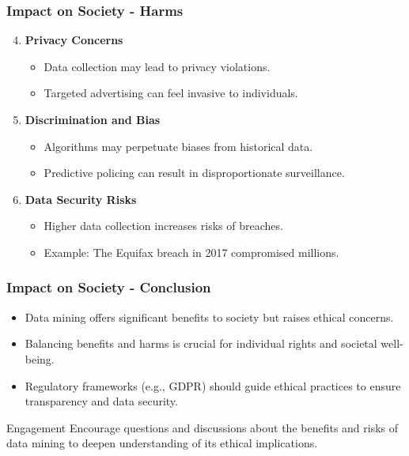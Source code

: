\documentclass{beamer}
\begin{document}
\begin{frame}[fragile]
    \frametitle{Impact on Society - Harms}
    \begin{enumerate}
        \setcounter{enumi}{3} %
        \item \textbf{Privacy Concerns}
            \begin{itemize}
                \item Data collection may lead to privacy violations.
                \item Targeted advertising can feel invasive to individuals.
            \end{itemize}

        \item \textbf{Discrimination and Bias}
            \begin{itemize}
                \item Algorithms may perpetuate biases from historical data.
                \item Predictive policing can result in disproportionate surveillance.
            \end{itemize}

        \item \textbf{Data Security Risks}
            \begin{itemize}
                \item Higher data collection increases risks of breaches.
                \item Example: The Equifax breach in 2017 compromised millions.
            \end{itemize}
    \end{enumerate}
\end{frame}

\begin{frame}[fragile]
    \frametitle{Impact on Society - Conclusion}
    \begin{itemize}
        \item Data mining offers significant benefits to society but raises ethical concerns.
        \item Balancing benefits and harms is crucial for individual rights and societal well-being.
        \item Regulatory frameworks (e.g., GDPR) should guide ethical practices to ensure transparency and data security.
    \end{itemize}
    
    \begin{block}{Engagement}
        Encourage questions and discussions about the benefits and risks of data mining to deepen understanding of its ethical implications.
    \end{block}
\end{frame}
\end{document}
